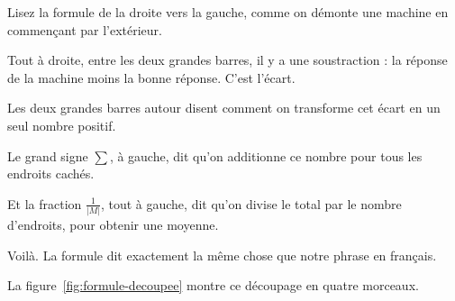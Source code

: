 \begin{enclair}
Lisez la formule de la droite vers la gauche, comme on démonte une machine
en commençant par l'extérieur.

Tout à droite, entre les deux grandes barres, il y a une soustraction : la
réponse de la machine moins la bonne réponse. C'est l'écart.

Les deux grandes barres autour disent comment on transforme cet écart en un
seul nombre positif.

Le grand signe $\sum$, à gauche, dit qu'on additionne ce nombre pour tous
les endroits cachés.

Et la fraction $\frac{1}{|M|}$, tout à gauche, dit qu'on divise le total par
le nombre d'endroits, pour obtenir une moyenne.

Voilà. La formule dit exactement la même chose que notre phrase en français.
\end{enclair}

La figure~\ref{fig:formule-decoupee} montre ce découpage en quatre morceaux.


